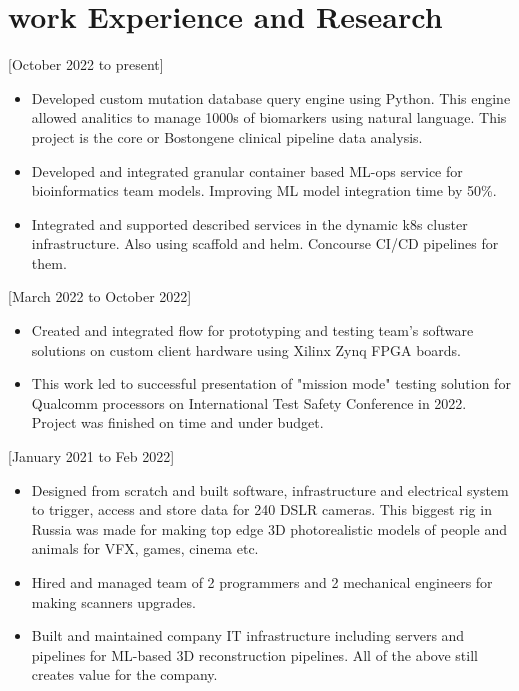 \documentclass{article}
\begin{document}
\section{work Experience and Research}

[October 2022 to present]
   \begin{itemize}
      \item Developed custom mutation database query engine using Python. This engine allowed analitics to manage 1000s of biomarkers using natural language. This project is the core or Bostongene clinical pipeline data analysis.
      \item Developed and integrated granular container based ML-ops service for bioinformatics team models. Improving ML model integration time by 50\%.
      \item Integrated and supported described services in the dynamic k8s cluster infrastructure. Also using scaffold and helm. Concourse CI/CD pipelines for them.
    \end{itemize}

[March 2022 to October 2022]
   \begin{itemize}
      \item Created and integrated flow for prototyping and testing team's software solutions on custom client hardware using Xilinx Zynq FPGA boards.
      \item This work led to successful presentation of "mission mode" testing solution for Qualcomm processors on International Test Safety Conference in 2022. Project was finished on time and under budget.
   \end{itemize}  

[January 2021 to Feb 2022]
\begin{itemize}
   \item Designed from scratch and built software, infrastructure and electrical system to trigger, access and store data for 240 DSLR cameras. This biggest rig in Russia was made for making top edge 3D photorealistic models of people and animals for VFX, games, cinema etc.
   \item Hired and managed team of 2 programmers and 2 mechanical engineers for making scanners upgrades.
   \item Built and maintained company IT infrastructure including servers and pipelines for ML-based 3D reconstruction pipelines. All of the above still creates value for the company.
\end{itemize}
\end{document}
